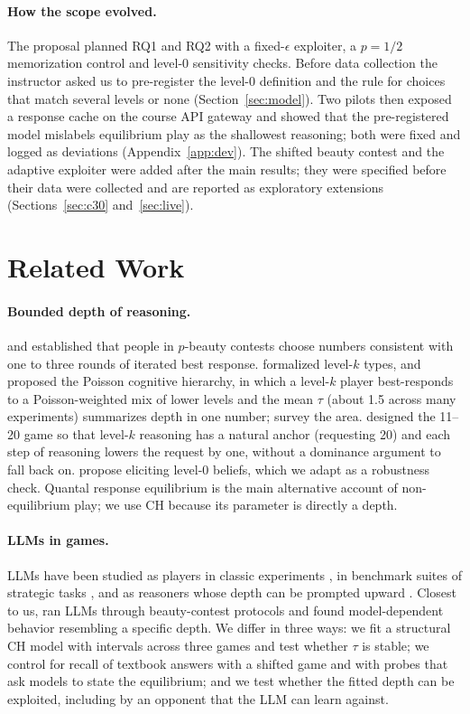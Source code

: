\documentclass[11pt]{article}
\begin{document}
\paragraph{How the scope evolved.} The proposal planned RQ1 and RQ2 with a fixed-$\epsilon$ exploiter, a $p=1/2$ memorization control and level-0 sensitivity checks. Before data collection the instructor asked us to pre-register the level-0 definition and the rule for choices that match several levels or none (Section~\ref{sec:model}). Two pilots then exposed a response cache on the course API gateway and showed that the pre-registered model mislabels equilibrium play as the shallowest reasoning; both were fixed and logged as deviations (Appendix~\ref{app:dev}). The shifted beauty contest and the adaptive exploiter were added after the main results; they were specified before their data were collected and are reported as exploratory extensions (Sections~\ref{sec:c30} and~\ref{sec:live}).

\section{Related Work}
\paragraph{Bounded depth of reasoning.} \citet{nagel1995} and \citet{ho1998} established that people in $p$-beauty contests choose numbers consistent with one to three rounds of iterated best response. \citet{stahl1995} formalized level-$k$ types, and \citet{camerer2004} proposed the Poisson cognitive hierarchy, in which a level-$k$ player best-responds to a Poisson-weighted mix of lower levels and the mean $\tau$ (about 1.5 across many experiments) summarizes depth in one number; \citet{crawford2013} survey the area. \citet{arad2012} designed the 11--20 game so that level-$k$ reasoning has a natural anchor (requesting 20) and each step of reasoning lowers the request by one, without a dominance argument to fall back on. \citet{wang2026} propose eliciting level-0 beliefs, which we adapt as a robustness check. Quantal response equilibrium \citep{mckelvey1995} is the main alternative account of non-equilibrium play; we use CH because its parameter is directly a depth.

\paragraph{LLMs in games.} LLMs have been studied as players in classic experiments \citep{guo2023,akata2025}, in benchmark suites of strategic tasks \citep{duan2024}, and as reasoners whose depth can be prompted upward \citep{gandhi2023,zhang2025}. Closest to us, \citet{alekseenko2025} ran LLMs through beauty-contest protocols and found model-dependent behavior resembling a specific depth. We differ in three ways: we fit a structural CH model with intervals across three games and test whether $\tau$ is stable; we control for recall of textbook answers with a shifted game and with probes that ask models to state the equilibrium; and we test whether the fitted depth can be exploited, including by an opponent that the LLM can learn against.
\end{document}
